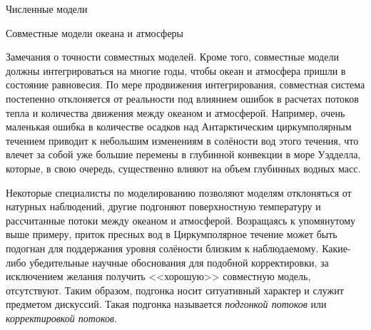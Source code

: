 \begin{chapter}{Численные модели}
\begin{section}{Совместные модели океана и атмосферы}
\begin{paragraph}{Замечания о точности совместных моделей.}
Кроме того, совместные модели должны интегрироваться на многие годы,
чтобы океан и атмосфера пришли в состояние равновесия. По мере продвижения
интегрирования, совместная система постепенно отклоняется от реальности
под влиянием ошибок в расчетах потоков тепла и количества движения
между океаном и атмосферой. Например, очень маленькая ошибка в количестве
осадков над Антарктическим циркумполярным течением приводит к небольшим
изменениям в солёности вод этого течения, что влечет за собой уже большие
перемены в глубинной конвекции в море Уэдделла, которые, в свою очередь, 
существенно влияют на объем глубинных водных масс.
%

Некоторые специалисты по моделированию позволяют моделям отклоняться от
натурных наблюдений, другие подгоняют поверхностную температуру и 
рассчитанные потоки между океаном и атмосферой. Возращаясь к упомянутому выше
примеру, приток пресных вод в Циркумполярное течение может быть подогнан 
для поддержания уровня солёности близким к наблюдаемому.
Какие-либо убедительные научные обоснования для подобной корректировки,
за исключением желания получить <<хорошую>> совместную модель, отсутствуют.
Таким образом, подгонка носит ситуативный характер и служит предметом 
дискуссий. Такая подгонка называется \emph{подгонкой потоков}%
%
или \emph{корректировкой потоков}. 
%


\end{paragraph}
\end{section}
\end{chapter}
